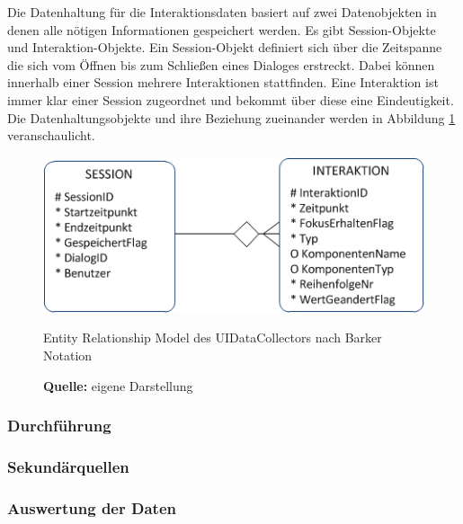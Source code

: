 Die Datenhaltung für die Interaktionsdaten basiert auf zwei Datenobjekten in denen alle nötigen Informationen gespeichert werden. Es gibt Session-Objekte und Interaktion-Objekte. Ein Session-Objekt definiert sich über die Zeitspanne die sich vom Öffnen bis zum Schließen eines Dialoges erstreckt. Dabei können innerhalb einer Session mehrere Interaktionen stattfinden. Eine Interaktion ist immer klar einer Session zugeordnet und bekommt über diese eine Eindeutigkeit. Die Datenhaltungsobjekte und ihre Beziehung zueinander werden in Abbildung \ref{fig:ermUIDataCollector} veranschaulicht.
\begin{figure}[H]
  \centering
  \includegraphics[scale=1]{img/ERM_UIDataCollector.png}
  \caption{Entity Relationship Model des UIDataCollectors nach Barker Notation \citep[vgl.][]{Inguanez2012}}
  \label{fig:ermUIDataCollector}
  \caption*{\textbf{Quelle:} eigene Darstellung}
\end{figure}



\subsubsection{Durchführung}

\subsubsection{Sekundärquellen}

\subsubsection{Auswertung der Daten}
